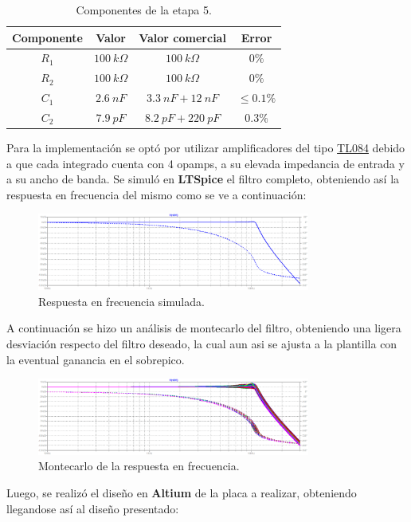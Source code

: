 \begin{table}[H]
\centering
\begin{tabular}{cccc}
\hline
Componente & Valor & Valor comercial & Error \\ \hline
$R_1$ & $100 \ k\Omega$ & $100 \ k\Omega$ & $0\%$ \\
$R_2$ & $100 \ k\Omega$ & $100 \ k\Omega$ & $0\%$\\
$C_1$ & $2.6 \ nF$ & $3.3 \ nF + 12 \ nF$ & $\le0.1\%$ \\
$C_2$ & $7.9 \ pF$ & $8.2 \ pF + 220 \ pF$ & $0.3\%$ \\ \hline
\end{tabular}
\caption{Componentes de la etapa 5.}
\end{table}

Para la implementación se optó por utilizar amplificadores del tipo \href{http://www.ti.com/lit/ds/symlink/tl082.pdf}{TL084} debido a que cada integrado cuenta con 4 opamps, a su elevada impedancia de entrada y a su ancho de banda. Se simuló en \textbf{LTSpice} el filtro completo, obteniendo así la respuesta en frecuencia del mismo como se ve a continuación:
 \begin{figure}[H]
	\centering
	\includegraphics[width=0.8\textwidth]{ImagenesEjercicio2/spice.PNG}
\caption{Respuesta en frecuencia simulada.}
	\label{fig:transspice}
\end{figure}
A continuación se hizo un análisis de montecarlo del filtro, obteniendo una ligera desviación respecto del filtro deseado, la cual aun asi se ajusta a la plantilla con la eventual ganancia en el sobrepico.
 \begin{figure}[H]
	\centering
	\includegraphics[width=0.8\textwidth]{ImagenesEjercicio2/montecarlo.PNG}
\caption{Montecarlo de la respuesta en frecuencia.}
	\label{fig:montecarlo}
\end{figure}
Luego, se realizó el diseño en \textbf{Altium} de la placa a realizar, obteniendo llegandose así al diseño presentado:
